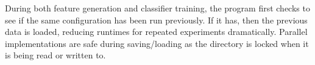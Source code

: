         During both feature generation and classifier training, the program first checks to see if the same configuration has been run previously. If it has, then the previous data is loaded, reducing runtimes for repeated experiments dramatically. Parallel implementations are safe during saving/loading as the directory is locked when it is being read or written to.
   
